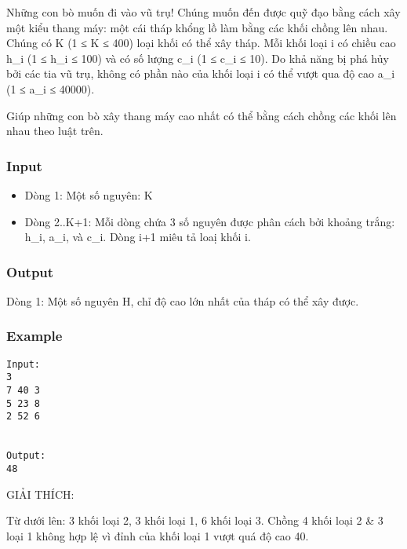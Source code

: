 

Những con bò muốn đi vào vũ trụ! Chúng muốn đến được quỹ đạo bằng cách xây một kiểu thang máy: một cái tháp khổng lồ làm bằng các khối chồng lên nhau. Chúng có K (1 ≤ K ≤ 400) loại khối có thể xây tháp. Mỗi khối loại i có chiều cao h\_i (1 ≤ h\_i ≤ 100) và có số lượng c\_i (1 ≤ c\_i ≤ 10). Do khả năng bị phá hủy bởi các tia vũ trụ, không có phần nào của khối loại i có thể vượt qua độ cao a\_i (1 ≤ a\_i ≤ 40000).

Giúp những con bò xây thang máy cao nhất có thể bằng cách chồng các khối lên nhau theo luật trên.

\subsubsection{Input}
\begin{itemize}
	\item Dòng 1: Một số nguyên: K
	\item Dòng 2..K+1: Mỗi dòng chứa 3 số nguyên được phân cách bởi khoảng trắng: h\_i, a\_i, và c\_i. Dòng i+1 miêu tả loaị khối i.
\end{itemize}

\subsubsection{Output}

Dòng 1: Một số nguyên H, chỉ độ cao lớn nhất của tháp có thể xây được.

\subsubsection{Example}
\begin{verbatim}
Input:
3
7 40 3
5 23 8
2 52 6


Output:
48
\end{verbatim}

GIẢI THÍCH:

Từ dưới lên: 3 khối loại 2, 3 khối loại 1, 6 khối loại 3. Chồng 4 khối loại 2 \& 3 loại 1 không hợp lệ vì đỉnh của khối loại 1 vượt quá độ cao 40.
